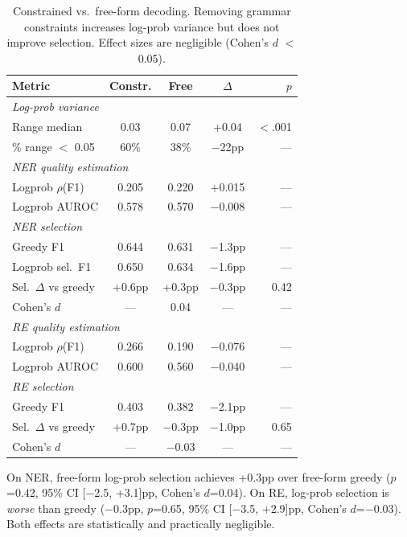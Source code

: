 \documentclass[11pt,a4paper]{article}
\begin{document}
\begin{table}[t]
\centering
\small
\begin{tabular}{l ccc r}
\toprule
\textbf{Metric} & \textbf{Constr.} & \textbf{Free} & $\Delta$ & $p$ \\
\midrule
\multicolumn{5}{l}{\textit{Log-prob variance}} \\
Range median & 0.03 & 0.07 & +0.04 & $<$.001 \\
\% range $<$ 0.05 & 60\% & 38\% & $-$22pp & --- \\
\midrule
\multicolumn{5}{l}{\textit{NER quality estimation}} \\
Logprob $\rho$(F1) & 0.205 & 0.220 & +0.015 & --- \\
Logprob AUROC & 0.578 & 0.570 & $-$0.008 & --- \\
\midrule
\multicolumn{5}{l}{\textit{NER selection}} \\
Greedy F1 & 0.644 & 0.631 & $-$1.3pp & --- \\
Logprob sel.\ F1 & 0.650 & 0.634 & $-$1.6pp & --- \\
Sel.\ $\Delta$ vs greedy & +0.6pp & +0.3pp & $-$0.3pp & 0.42 \\
Cohen's $d$ & --- & 0.04 & --- & --- \\
\midrule
\multicolumn{5}{l}{\textit{RE quality estimation}} \\
Logprob $\rho$(F1) & 0.266 & 0.190 & $-$0.076 & --- \\
Logprob AUROC & 0.600 & 0.560 & $-$0.040 & --- \\
\midrule
\multicolumn{5}{l}{\textit{RE selection}} \\
Greedy F1 & 0.403 & 0.382 & $-$2.1pp & --- \\
Sel.\ $\Delta$ vs greedy & +0.7pp & $-$0.3pp & $-$1.0pp & 0.65 \\
Cohen's $d$ & --- & $-$0.03 & --- & --- \\
\bottomrule
\end{tabular}
\caption{Constrained vs.\ free-form decoding. Removing grammar constraints increases log-prob variance but does not improve selection. Effect sizes are negligible (Cohen's $d$ $<$ 0.05).}
\label{tab:freeform_main}
\end{table}

On NER, free-form log-prob selection achieves +0.3pp over free-form greedy ($p$=0.42, 95\% CI [$-$2.5, +3.1]pp, Cohen's $d$=0.04). On RE, log-prob selection is \emph{worse} than greedy ($-$0.3pp, $p$=0.65, 95\% CI [$-$3.5, +2.9]pp, Cohen's $d$=$-$0.03). Both effects are statistically and practically negligible.
\end{document}
